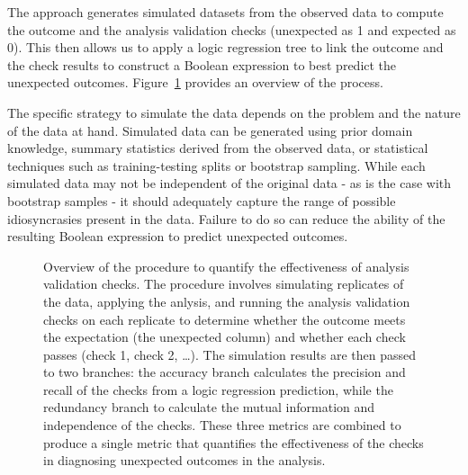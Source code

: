 \documentclass[
  12pt,
]{interact}
\begin{document}
The approach generates simulated datasets from the observed data to
compute the outcome and the analysis validation checks (unexpected as 1
and expected as 0). This then allows us to apply a logic regression tree
to link the outcome and the check results to construct a Boolean
expression to best predict the unexpected outcomes.
Figure~\ref{fig-metric-calc} provides an overview of the process.

The specific strategy to simulate the data depends on the problem and
the nature of the data at hand. Simulated data can be generated using
prior domain knowledge, summary statistics derived from the observed
data, or statistical techniques such as training-testing splits or
bootstrap sampling. While each simulated data may not be independent of
the original data - as is the case with bootstrap samples - it should
adequately capture the range of possible idiosyncrasies present in the
data. Failure to do so can reduce the ability of the resulting Boolean
expression to predict unexpected outcomes.

\begin{figure}


\caption{\label{fig-metric-calc}Overview of the procedure to quantify
the effectiveness of analysis validation checks. The procedure involves
simulating replicates of the data, applying the anlysis, and running the
analysis validation checks on each replicate to determine whether the
outcome meets the expectation (the unexpected column) and whether each
check passes (check 1, check 2, \ldots). The simulation results are then
passed to two branches: the accuracy branch calculates the precision and
recall of the checks from a logic regression prediction, while the
redundancy branch to calculate the mutual information and independence
of the checks. These three metrics are combined to produce a single
metric that quantifies the effectiveness of the checks in diagnosing
unexpected outcomes in the analysis.}

\end{figure}%
\end{document}
